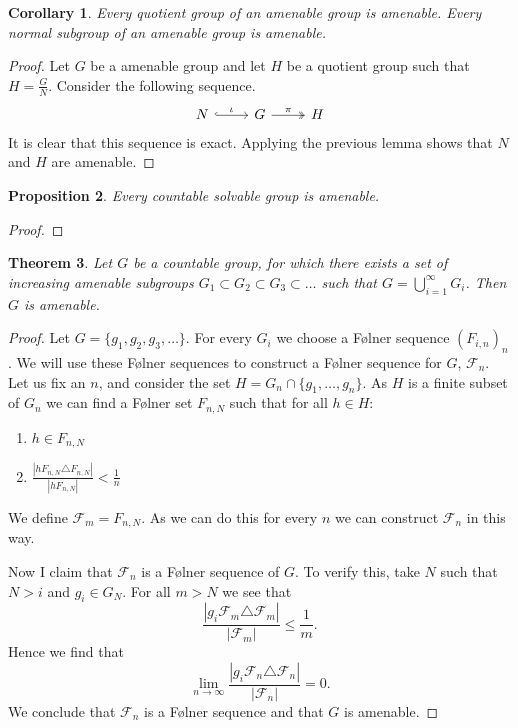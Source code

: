\documentclass[titlepage, a4paper]{article}
\newcommand{\card}[1]{\left| #1 \right|}
\newtheorem{theorem}{Theorem}[section]
\newtheorem{proposition}[theorem]{Proposition}
\newtheorem{corollary}[theorem]{Corollary}
\theoremstyle{remark}
\begin{document}
    \begin{corollary}\label{cor:quotient_amenable}
	    Every quotient group of an amenable group is amenable. Every normal subgroup of an amenable group is amenable. 
    \end{corollary}
    \begin{proof}
	    Let $G$ be a amenable group and let $H$ be a quotient group such that $H = \frac{G}{N}$. 
        Consider the following sequence.
        \[\begin{tikzcd}
            N \arrow[r, "\iota", hook] & G \arrow[r, "\pi", two heads] & H
        \end{tikzcd}\]
        It is clear that this sequence is exact.
	    Applying the previous lemma shows that $N$ and $H$ are amenable.
    \end{proof}
    \begin{proposition}\label{thm:countable_solvable_amenable}
	    Every countable solvable group is amenable. 
    \end{proposition}
    \begin{proof}
        
    \end{proof}

    \begin{theorem}\label{thm:rising_amenable}
    	Let $G$ be a countable group, for which there exists a set of increasing amenable subgroups $G_1 \subset  G_2 \subset  G_3 \subset  \ldots$ such that $G = \bigcup_{i = 1}^{\infty} G_i$. Then $G$ is amenable.  
    \end{theorem}
    \begin{proof}
    	Let $G = \{g_1, g_2, g_3, \ldots\} $. 
	For every $G_i$ we choose a Følner sequence $(F_{i, n})_n$. We will use these Følner sequences to construct a Følner sequence for $G$, $\mathcal{F}_n$.
	Let us fix an $n$, and consider the set $H = G_n \cap \{g_1, \ldots, g_n\}$. 
	As $H$ is a finite subset of $G_n$ we can find a Følner set $F_{n, N}$ such that for all $h \in H:$ 
	\begin{enumerate}
		\item $h \in F_{n, N}$
		\item $\frac{\card{hF_{n,N}\triangle F_{n,N}}}{\card{hF_{n,N}}} < \frac{1}{n} $
	\end{enumerate}
	We define $\mathcal{F}_m = F_{n,N}$.
	As we can do this for every $n$ we can construct $\mathcal{F}_n$ in this way.

	Now I claim that $\mathcal{F}_n$ is a Følner sequence of $G$. 
	To verify this, take $N$ such that $N > i$ and $g_i \in G_N$. For all $m >N$ we see that \[
		\frac{\card{g_i \mathcal{F}_m \triangle \mathcal{F}_m }}{\card{\mathcal{F}_m}} \le \frac{1}{m}
	.\] 
	Hence we find that \[
		\lim_{n \to \infty} \frac{\card{g_i \mathcal{F}_n \triangle \mathcal{F}_n }}{\card{\mathcal{F}_n}} = 0
	.\] 
	We conclude that $\mathcal{F}_n$ is a Følner sequence and that  $G$ is amenable. 
    \end{proof}
\end{document}
